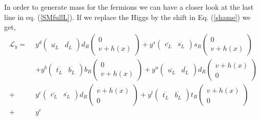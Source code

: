 In order to generate mass for the fermions we can have a closer look at the last line in eq. (\ref{SMfullL}). If we replace the Higgs by the shift in Eq. (\ref{shame}) we get, 
%
%
\begin{align}
\mathcal{L}_y = \, \, & y^d 
\begin{pmatrix}
\overline{u_L} & \overline{d_L} 
\end{pmatrix} d_R 
\begin{pmatrix}
0\\ v + h(x)
\end{pmatrix}  + 
y^s 
\begin{pmatrix}
\overline{c_L} & \overline{s_L} 
\end{pmatrix} s_R 
\begin{pmatrix}
0 \\ v + h(x)
\end{pmatrix} \nonumber  \\ & +
 y^b 
\begin{pmatrix}
\overline{t_L} & \overline{b_L} 
\end{pmatrix} b_R 
\begin{pmatrix}
0 \\ v + h(x)
\end{pmatrix}  +
 y^u 
\begin{pmatrix}
\overline{u_L} & \overline{d_L} 
\end{pmatrix} d_R 
\begin{pmatrix}
v + h(x) \\ 0
\end{pmatrix} \nonumber \\ + &   y^c 
\begin{pmatrix}
\overline{c_L} & \overline{s_L} 
\end{pmatrix} d_R 
\begin{pmatrix}
v + h(x) \\ 0 
\end{pmatrix} +
y^t
\begin{pmatrix}
\overline{t_L} & \overline{b_L} 
\end{pmatrix} t_R \begin{pmatrix}
 v + h(x) \\ 0
\end{pmatrix}   \\ + &  y^e 

\end{align}
